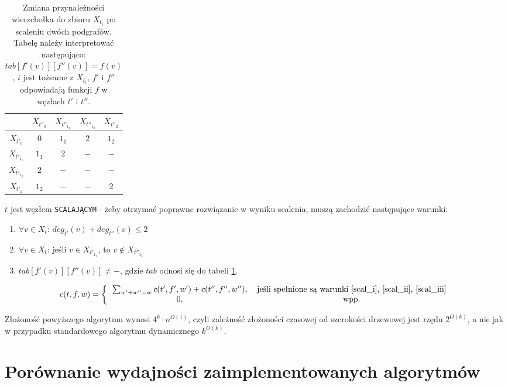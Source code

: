 \documentclass[12pt, oneside]{report}
\newcommand\Omicron{O}
\begin{document}
\begin{table}
\centering
\begin{tabular}{c|c|c|c|c}
 & $X_{t''_0}$ & $X_{t''_{1_1}}$ & $X_{t''_{1_2}}$ & $X_{t''_2}$ \\
\hline
$X_{t'_0}$ & $0$ & $1_1$ & $2$ & $1_2$ \\
\hline
$X_{t'_{1_1}}$ & $1_1$ & $2$ & $-$ & $-$ \\
\hline
$X_{t'_{1_2}}$ & $2$ & $-$ & $-$ & $-$ \\
\hline
$X_{t'_2}$ & $1_2$ & $-$ & $-$ & $2$ \\
\end{tabular}
\caption{Zmiana przynależności wierzchołka do zbioru $X_{t_i}$ po scaleniu dwóch podgrafów. Tabelę należy interpretować następująco: $tab[f'(v)][f''(v)] = f(v)$, $i$ jest tożsame z $X_{t_i}$, $f'$ i $f''$ odpowiadają funkcji $f$ w węzłach $t'$ i $t''$.}
\label{merge_table}
\end{table}
$$$$
$t$ jest węzłem \texttt{SCALAJĄCYM} - żeby otrzymać poprawne rozwiązanie w wyniku scalenia, muszą zachodzić następujące warunki:
\begin{enumerate}[label=(\roman*)]
\item \label{scal_i}$\forall v \in X_t$: $deg_{t'}(v) + deg_{t''}(v) \leq 2$
\item \label{scal_ii}$\forall v \in X_t$: jeśli $v \in X_{t'_{1_1}}$, to $v \notin X_{t''_{1_2}}$
\item \label{scal_iii}$tab[f'(v)][f''(v)] \neq -$, gdzie $tab$ odnosi się do tabeli \ref{merge_table}.
\end{enumerate}

\[
c(t,f,w) =  
\left \{
  \begin{tabular}{ccc}
  $\sum_{w' + w'' = w} c(t',f',w') + c(t'',f'',w'')$, & jeśli spełnione są warunki \ref{scal_i}, \ref{scal_ii}, \ref{scal_iii}\\
  0, & wpp. \\
  \end{tabular}
\right. 
\]

Złożoność powyższego algorytmu wynosi $4^k \cdot n^{\Omicron(1)}$, czyli zależność złożoności czasowej od szerokości drzewowej jest rzędu $2^{\Omicron(k)}$, a nie jak w przypadku standardowego algorytmu dynamicznego $k^{\Omicron(k)}$.

\newpage
  	\chapter{Porównanie wydajności zaimplementowanych algorytmów}
  	\label{summary}
\end{document}
